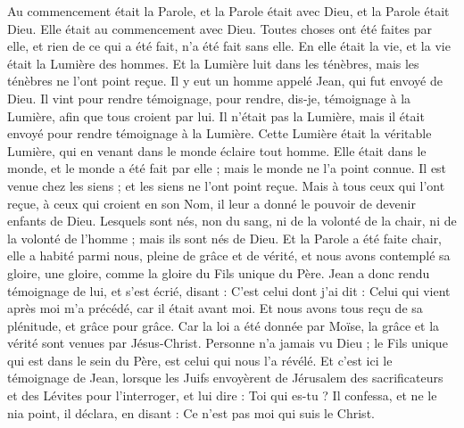 \begin{multicols}{2}
\VerseOne{}Au commencement était la Parole, et la Parole était avec Dieu, et la Parole était Dieu.
Elle était au commencement avec Dieu.
Toutes choses ont été faites par elle, et rien de ce qui a été fait, n'a été fait sans elle.
En elle était la vie, et la vie était la Lumière des hommes.
Et la Lumière luit dans les ténèbres, mais les ténèbres ne l'ont point reçue.
Il y eut un homme appelé Jean, qui fut envoyé de Dieu.
Il vint pour rendre témoignage, pour rendre, dis-je, témoignage à la Lumière, afin que tous croient par lui.
Il n'était pas la Lumière, mais il était envoyé pour rendre témoignage à la Lumière.
Cette Lumière était la véritable Lumière, qui en venant dans le monde éclaire tout homme.
Elle était dans le monde, et le monde a été fait par elle ; mais le monde ne l'a point connue.
Il est venue chez les siens ; et les siens ne l'ont point reçue.
Mais à tous ceux qui l'ont reçue, à ceux qui croient en son Nom, il leur a donné le pouvoir de devenir enfants de Dieu.
Lesquels sont nés, non du sang, ni de la volonté de la chair, ni de la volonté de l'homme ; mais ils sont nés de Dieu.
Et la Parole a été faite chair, elle a habité parmi nous, pleine de grâce et de vérité, et nous avons contemplé sa gloire, une gloire, comme la gloire du Fils unique du Père.
Jean a donc rendu témoignage de lui, et s'est écrié, disant : C'est celui dont j'ai dit : Celui qui vient après moi m'a précédé, car il était avant moi.
Et nous avons tous reçu de sa plénitude, et grâce pour grâce.
Car la loi a été donnée par Moïse, la grâce et la vérité sont venues par Jésus-Christ.
Personne n'a jamais vu Dieu ; le Fils unique qui est dans le sein du Père, est celui qui nous l'a révélé.
Et c'est ici le témoignage de Jean, lorsque les Juifs envoyèrent de Jérusalem des sacrificateurs et des Lévites pour l'interroger, et lui dire : Toi qui es-tu ?
Il confessa, et ne le nia point, il déclara, en disant : Ce n'est pas moi qui suis le Christ.

\end{multicols}
